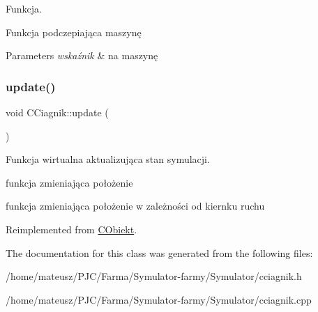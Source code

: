 Funkcja. 

Funkcja podczepiająca maszynę


\begin{DoxyParams}{Parameters}
{\em wskaźnik} & na maszynę \\
\hline
\end{DoxyParams}
\mbox{\label{class_c_ciagnik_a1596597ae77f6e71919e5c17affddad1}} 
\subsubsection{\texorpdfstring{update()}{update()}}
{\footnotesize\ttfamily void C\+Ciagnik\+::update (\begin{DoxyParamCaption}{ }\end{DoxyParamCaption})\hspace{0.3cm}{\ttfamily [virtual]}}



Funkcja wirtualna aktualizująca stan symulacji. 

funkcja zmieniająca położenie

funkcja zmieniająca położenie w zależności od kiernku ruchu 

Reimplemented from \mbox{\hyperlink{class_c_obiekt_adc05eb9790386eebbe24a31e434fd18f}{C\+Obiekt}}.



The documentation for this class was generated from the following files\+:\begin{DoxyCompactItemize}
\item 
/home/mateusz/\+P\+J\+C/\+Farma/\+Symulator-\/farmy/\+Symulator/cciagnik.\+h\item 
/home/mateusz/\+P\+J\+C/\+Farma/\+Symulator-\/farmy/\+Symulator/cciagnik.\+cpp\end{DoxyCompactItemize}
